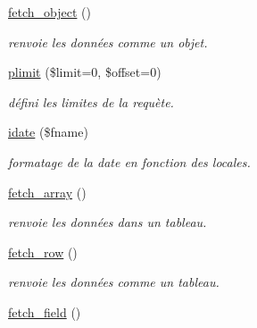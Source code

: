 \begin{CompactItemize}
\hyperlink{classDoliDb_a14}{fetch\_\-object} ()
\begin{CompactList}\small\item\em renvoie les donn\'{e}es comme un objet. \item\end{CompactList}\item 
\hyperlink{classDoliDb_a15}{plimit} (\$limit=0, \$offset=0)
\begin{CompactList}\small\item\em d\'{e}fini les limites de la requ\`{e}te. \item\end{CompactList}\item 
\hyperlink{classDoliDb_a17}{idate} (\$fname)
\begin{CompactList}\small\item\em formatage de la date en fonction des locales. \item\end{CompactList}\item 
\hyperlink{classDoliDb_a18}{fetch\_\-array} ()
\begin{CompactList}\small\item\em renvoie les donn\'{e}es dans un tableau. \item\end{CompactList}\item 
\hyperlink{classDoliDb_a19}{fetch\_\-row} ()
\begin{CompactList}\small\item\em renvoie les donn\'{e}es comme un tableau. \item\end{CompactList}\item 
\hypertarget{classDoliDb_a20}{
\hyperlink{classDoliDb_a20}{fetch\_\-field} ()}
\label{classDoliDb_a20}


\end{CompactItemize}

